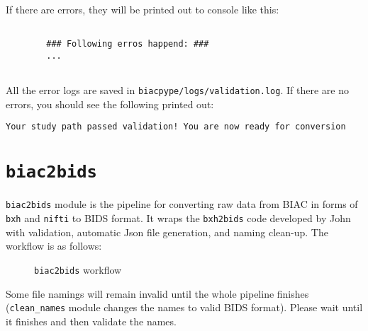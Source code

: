 \documentclass[12pt]{myland}
\def\<#1>{\texttt{#1}}
\begin{document}
    If there are errors, they will be printed out to console like this:
        \begin{lstlisting}[xleftmargin=.2\textwidth, xrightmargin=.2\textwidth]

        ### Following erros happend: ###
        ... 


        \end{lstlisting}        
   
    All the error logs are saved in \<biacpype/logs/validation.log>. If there are no errors,
    you should see the following printed out:
    \begin{center}\<Your study path passed validation! You are now ready for conversion>\end{center}



\section{\texttt{biac2bids}}

   \texttt{biac2bids} module is the pipeline for converting raw data from BIAC in forms of \texttt{bxh} and
   \texttt{nifti} to BIDS format. It wraps the \<bxh2bids> code developed by John with validation,
   automatic Json file generation, and naming clean-up. The workflow is as follows:

    \begin{figure}[h]
        \begin{mybox}
            \centering
        \end{mybox}
        \caption{\<biac2bids> workflow}
    \end{figure}

    \color{red}{Note:} \color{black}Some file namings will remain invalid until the whole pipeline finishes (\texttt{clean\_names} module changes the names to valid BIDS format). Please
    wait until it finishes and then validate the names. 
\end{document}
